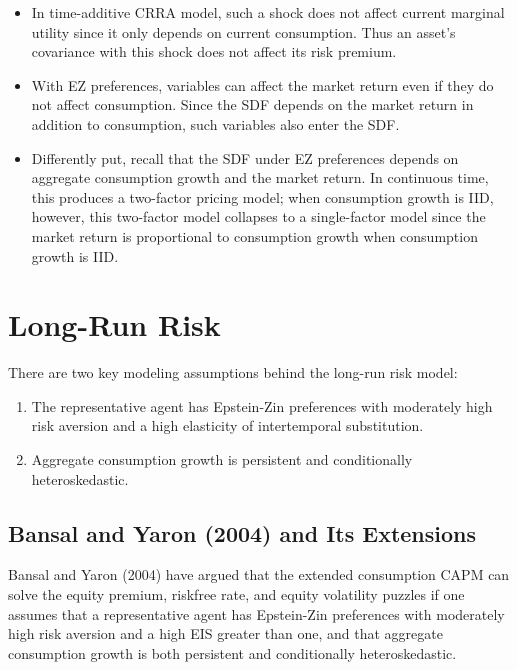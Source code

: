 \documentclass[
]{book}
\providecommand{\tightlist}{%
  \setlength{\itemsep}{0pt}\setlength{\parskip}{0pt}}
\begin{document}
\begin{itemize}
\item
  In time-additive CRRA model, such a shock does not affect current marginal utility since it only depends on current consumption. Thus an asset's covariance with this shock does not affect its risk premium.
\item
  With EZ preferences, variables can affect the market return even if they do not affect consumption. Since the SDF depends on the market return in addition to consumption, such variables also enter the SDF.
\item
  Differently put, recall that the SDF under EZ preferences depends on aggregate consumption growth and the market return. In continuous time, this produces a two-factor pricing model; when consumption growth is IID, however, this two-factor model collapses to a single-factor model since the market return is proportional to consumption growth when consumption growth is IID.
\end{itemize}

\hypertarget{long-run-risk}{%
\section{Long-Run Risk}\label{long-run-risk}}

There are two key modeling assumptions behind the long-run risk model:

\begin{enumerate}
\def\labelenumi{\arabic{enumi}.}
\tightlist
\item
  The representative agent has Epstein-Zin preferences with moderately high risk aversion and a high elasticity of intertemporal substitution.
\item
  Aggregate consumption growth is persistent and conditionally heteroskedastic.
\end{enumerate}

\hypertarget{bansal-and-yaron-2004-and-its-extensions}{%
\subsection{Bansal and Yaron (2004) and Its Extensions}\label{bansal-and-yaron-2004-and-its-extensions}}

Bansal and Yaron (2004) have argued that the extended consumption CAPM can solve the equity premium, riskfree rate, and equity volatility puzzles if one assumes that a representative agent has Epstein-Zin preferences with moderately high risk aversion and a high EIS greater than one, and that aggregate consumption growth is both persistent and conditionally heteroskedastic.
\end{document}
